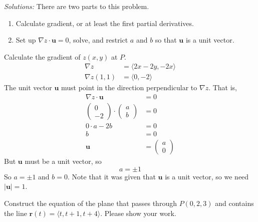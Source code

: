 \ifnum {} {\color{DarkBlue} \textit{Solutions:} 
There are two parts to this problem. 
\begin{enumerate}
    \item Calculate gradient, or at least the first partial derivatives. 
    \item Set up $\nabla z \cdot \mathbf u = 0$, solve, and restrict $a$ and $b$ so that $\mathbf u$ is a unit vector. 
\end{enumerate}
Calculate the gradient of $z(x,y)$ at $P$. 
\begin{align}
    \nabla z &= \langle 2x-2y, -2x\rangle \\
     \nabla z(1,1) &= \langle 0,-2\rangle 
\end{align}
The unit vector $\mathbf u$ must point in the direction perpendicular to $\nabla z$. That is, 
\begin{align}
    \nabla z \cdot \mathbf u & = 0 \\
    \begin{pmatrix} 0\\-2 \end{pmatrix} \cdot \begin{pmatrix} a\\b\end{pmatrix} & = 0 \\
    0\cdot a -2b & = 0 \\
    b &=0 \\
    \mathbf u &= \begin{pmatrix} a\\0\end{pmatrix}
\end{align}
But $\mathbf u$ must be a unit vector, so $$a = \pm 1$$
So $a=\pm1$ and $b=0$. Note that it was given that $\mathbf u$ is a unit vector, so we need $|\mathbf u| = 1$. 
}
\else
          \vspace{6cm}
\fi
\fi


\ifnum {}
    \question[4] Construct the equation of the plane that passes through $P(0,2,3)$ and contains the line $\mathbf r(t) = \langle t,t+1,t+4\rangle $. Please show your work. 
    
